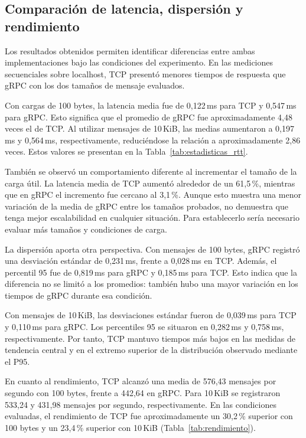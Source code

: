

\subsection{Comparación de latencia, dispersión y rendimiento}

Los resultados obtenidos permiten identificar diferencias
entre ambas implementaciones bajo las condiciones del
experimento. En las mediciones secuenciales sobre localhost,
TCP presentó menores tiempos de respuesta que gRPC con los
dos tamaños de mensaje evaluados.

Con cargas de 100 bytes, la latencia media fue de
0,122\,ms para TCP y 0,547\,ms para gRPC. Esto significa
que el promedio de gRPC fue aproximadamente 4,48 veces
el de TCP. Al utilizar mensajes de 10\,KiB, las medias
aumentaron a 0,197\,ms y 0,564\,ms, respectivamente,
reduciéndose la relación a aproximadamente 2,86 veces.
Estos valores se presentan en la
Tabla~\ref{tab:estadisticas_rtt}.

También se observó un comportamiento diferente al
incrementar el tamaño de la carga útil. La latencia
media de TCP aumentó alrededor de un 61,5\,\%,
mientras que en gRPC el incremento fue cercano
al 3,1\,\%. Aunque esto muestra una menor variación
de la media de gRPC entre los tamaños probados,
no demuestra que tenga mejor escalabilidad en
cualquier situación. Para establecerlo sería
necesario evaluar más tamaños y condiciones de carga.

La dispersión aporta otra perspectiva. Con mensajes
de 100 bytes, gRPC registró una desviación estándar
de 0,231\,ms, frente a 0,028\,ms en TCP. Además,
el percentil 95 fue de 0,819\,ms para gRPC y
0,185\,ms para TCP. Esto indica que la diferencia
no se limitó a los promedios: también hubo una
mayor variación en los tiempos de gRPC durante
esa condición.

Con mensajes de 10\,KiB, las desviaciones estándar
fueron de 0,039\,ms para TCP y 0,110\,ms para gRPC.
Los percentiles 95 se situaron en 0,282\,ms y
0,758\,ms, respectivamente. Por tanto, TCP mantuvo
tiempos más bajos en las medidas de tendencia
central y en el extremo superior de la
distribución observado mediante el P95.

En cuanto al rendimiento, TCP alcanzó una media
de 576,43 mensajes por segundo con 100 bytes,
frente a 442,64 en gRPC. Para 10\,KiB se
registraron 533,24 y 431,98 mensajes por segundo,
respectivamente. En las condiciones evaluadas,
el rendimiento de TCP fue aproximadamente un
30,2\,\% superior con 100 bytes y un 23,4\,\%
superior con 10\,KiB
(Tabla~\ref{tab:rendimiento}).

